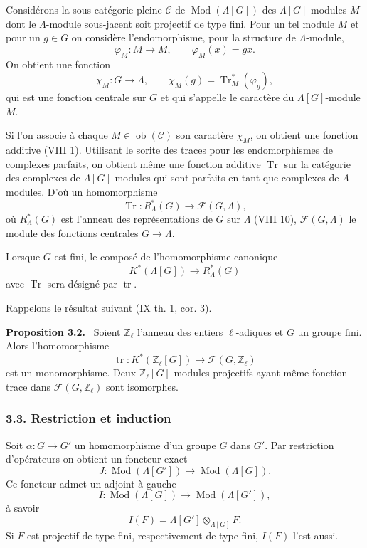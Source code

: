 \documentclass[11pt]{article}
\newenvironment{statement}[1]{\par\medskip\noindent\textbf{#1.}\ }{\par\medskip}
\providecommand{\Tr}{\operatorname{Tr}}
\providecommand{\Tr}{\operatorname{Tr}}
\providecommand{\Ob}{\operatorname{ob}}
\providecommand{\Tr}{\operatorname{Tr}}
\providecommand{\Ob}{\operatorname{ob}}
\providecommand{\Tr}{\operatorname{Tr}}
\providecommand{\Ob}{\operatorname{Ob}}
\providecommand{\Mod}{\operatorname{Mod}}
\providecommand{\tr}{\operatorname{tr}}
\providecommand{\Tr}{\operatorname{Tr}}
\providecommand{\Ob}{\operatorname{ob}}
\begin{document}
Considérons la sous-catégorie pleine $\mathcal C$ de $\Mod(\Lambda[G])$ des $\Lambda[G]$-modules $M$ dont le $\Lambda$-module sous-jacent soit projectif de type fini. Pour un tel module $M$ et pour un $g\in G$ on considère l'endomorphisme, pour la structure de $\Lambda$-module,
\[
\varphi_M:M\longrightarrow M,
\qquad \varphi_M(x)=gx.
\]
On obtient une fonction
\[
\chi_M:G\longrightarrow \Lambda,
\qquad \chi_M(g)=\Tr^*_M(\varphi_g),
\]
qui est une fonction centrale sur $G$ et qui s'appelle le caractère du $\Lambda[G]$-module $M$.

Si l'on associe à chaque $M\in\Ob(\mathcal C)$ son caractère $\chi_M$, on obtient une fonction additive (VIII 1). Utilisant le sorite des traces pour les endomorphismes de complexes parfaits, on obtient même une fonction additive $\Tr$ sur la catégorie des complexes de $\Lambda[G]$-modules qui sont parfaits en tant que complexes de $\Lambda$-modules. D'où un homomorphisme
\[
\Tr:R^*_{\Lambda}(G)\longrightarrow \mathcal F(G,\Lambda),
\]
où $R^*_{\Lambda}(G)$ est l'anneau des représentations de $G$ sur $\Lambda$ (VIII 10), $\mathcal F(G,\Lambda)$ le module des fonctions centrales $G\to\Lambda$.

Lorsque $G$ est fini, le composé de l'homomorphisme canonique
\[
K^*(\Lambda[G])\longrightarrow R^*_{\Lambda}(G)
\]
avec $\Tr$ sera désigné par $\tr$.

Rappelons le résultat suivant (IX th. 1, cor. 3).

\begin{statement}{Proposition 3.2}
Soient $\mathbb Z_\ell$ l'anneau des entiers $\ell$-adiques et $G$ un groupe fini. Alors l'homomorphisme
\[
\tr:K^*(\mathbb Z_\ell[G])\longrightarrow \mathcal F(G,\mathbb Z_\ell)
\]
est un monomorphisme. Deux $\mathbb Z_\ell[G]$-modules projectifs ayant même fonction trace dans $\mathcal F(G,\mathbb Z_\ell)$ sont isomorphes.
\end{statement}

\subsubsection*{3.3. Restriction et induction}

Soit $\alpha:G\to G'$ un homomorphisme d'un groupe $G$ dans $G'$. Par restriction d'opérateurs on obtient un foncteur exact
\[
J:\Mod(\Lambda[G'])\longrightarrow\Mod(\Lambda[G]).
\]
Ce foncteur admet un adjoint à gauche
\[
I:\Mod(\Lambda[G])\longrightarrow\Mod(\Lambda[G']),
\]
à savoir
\[
I(F)=\Lambda[G']\otimes_{\Lambda[G]}F.
\]
Si $F$ est projectif de type fini, respectivement de type fini, $I(F)$ l'est aussi.
\end{document}
